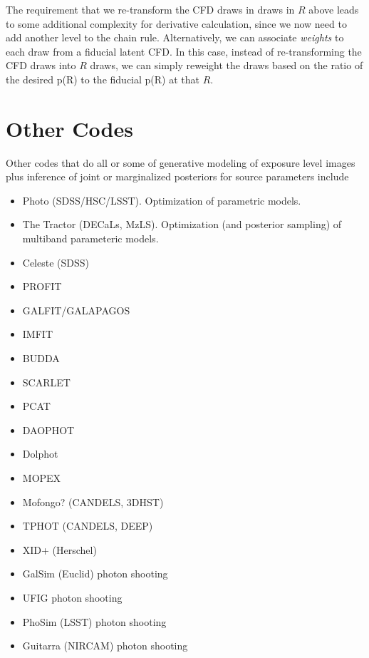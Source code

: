 \documentclass[modern]{aastex62}
\begin{document}
The requirement that we re-transform the CFD draws in draws in $R$ above leads to some additional complexity for derivative calculation, 
since we now need to add another level to the chain rule.
Alternatively, we can associate \emph{weights} to each draw from a fiducial latent CFD.
In this case, instead of re-transforming the CFD draws into $R$ draws, 
we can simply reweight the draws based on the ratio of the desired p(R) to the fiducial p(R) at that $R$.


\section{Other Codes}
Other codes that do all or some of generative modeling of exposure level images plus inference of joint or marginalized posteriors for source parameters include
\begin{itemize}
\item Photo (SDSS/HSC/LSST).  Optimization of parametric models.
\item The Tractor (DECaLs, MzLS).  Optimization (and posterior sampling) of multiband parameteric models.
\item Celeste (SDSS)
 \item PROFIT
\item GALFIT/GALAPAGOS
\item IMFIT
\item BUDDA

\item SCARLET
  
\item PCAT
\item DAOPHOT
\item Dolphot
\item MOPEX

\item Mofongo? (CANDELS, 3DHST)
\item TPHOT (CANDELS, DEEP) 
\item XID+ (Herschel)

\item GalSim (Euclid) photon shooting
\item UFIG photon shooting
\item PhoSim (LSST) photon shooting
\item Guitarra (NIRCAM) photon shooting

\end{itemize}
\end{document}
